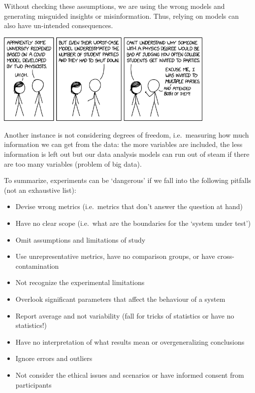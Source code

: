 \documentclass[]{book}
\providecommand{\tightlist}{%
  \setlength{\itemsep}{0pt}\setlength{\parskip}{0pt}}
\begin{document}
Without checking these assumptions, we are using the wrong models and generating misguided insights or misinformation. Thus, relying on models can also have un-intended consequences.

\includegraphics[width=0.8\textwidth,height=\textheight]{fig/modeling_gonewrong.png}

Another instance is not considering degrees of freedom, i.e.~measuring how much information we can get from the data: the more variables are included, the less information is left out but our data analysis models can run out of steam if there are too many variables (problem of big data).

To summarize, experiments can be `dangerous' if we fall into the following pitfalls (not an exhaustive list):

\begin{itemize}
\tightlist
\item
  Devise wrong metrics (i.e.~metrics that don't answer the question at hand)
\item
  Have no clear scope (i.e.~what are the boundaries for the `system under test')
\item
  Omit assumptions and limitations of study
\item
  Use unrepresentative metrics, have no comparison groups, or have cross-contamination
\item
  Not recognize the experimental limitations
\item
  Overlook significant parameters that affect the behaviour of a system
\item
  Report average and not variability (fall for tricks of statistics or have no statistics!)
\item
  Have no interpretation of what results mean or overgeneralizing conclusions
\item
  Ignore errors and outliers
\item
  Not consider the ethical issues and scenarios or have informed consent from participants
\end{itemize}
\end{document}
